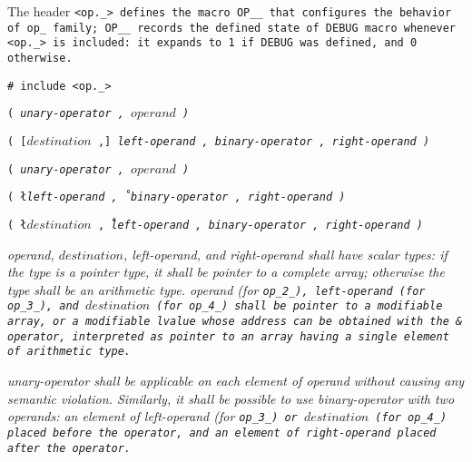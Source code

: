The header \tt{<op._>} defines the macro \tt{OP__} that configures
the behavior of \tt{op_} family; \tt{OP__} records the \tt{defined}
state of \tt{DEBUG} macro whenever \tt{<op._>} is included:
it expands to \tt{1} if \tt{DEBUG} was defined, and \tt{0} otherwise.


\tt{# include <op._>}

\s\s\s\tt{(} \it{unary-operator} \tt{,} $operand$ \tt{)}

\s\s\s\tt{(} [$destination$ \tt{,}]
\it{left-operand} \tt{,} \it{binary-operator} \tt{,} \it{right-operand} \tt{)}

\s\tt{(} \it{unary-operator} \tt{,} $operand$ \tt{)}

\s\tt{(} \l\it{left-operand} \tt{,}\r\
\it{binary-operator} \tt{,} \it{right-operand} \tt{)}

\s\tt{(} \l$destination$  \tt{,}\r\
\it{left-operand} \tt{,} \it{binary-operator} \tt{,} \it{right-operand} \tt{)}

\head{Constraints}

\it{operand}, $destination$, \it{left-operand}, and \it{right-operand}
shall have scalar types: if the type is a pointer type, it shall be
pointer to a complete array; otherwise the type shall be an arithmetic type.
\it{operand} (for \tt{op_2_}), \it{left-operand} (for \tt{op_3_}),
and $destination$ (for \tt{op_4_}) shall be pointer to a modifiable array,
or a modifiable lvalue whose address can be obtained with the \tt{&} operator,
interpreted as pointer to an array having a single element of arithmetic type.

\it{unary-operator} shall be applicable on each element
of \it{operand} without causing any semantic violation.
Similarly, it shall be possible to use \it{binary-operator} with
two operands: an element of \it{left-operand} (for \tt{op_3_})
or $destination$ (for \tt{op_4_}) placed before the operator,
and an element of \it{right-operand} placed after the operator.

\head{Semantics}

